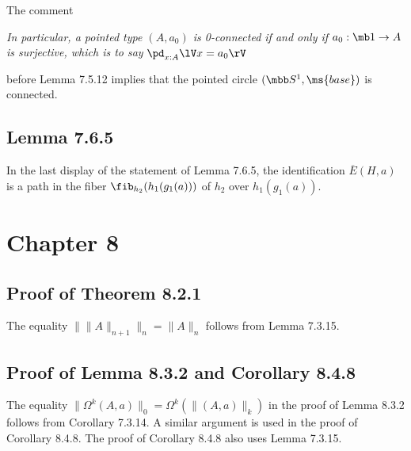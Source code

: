 \documentclass[12pt]{article}
\begin{document}
The comment

\nn\emph{In particular, a pointed type $(A, a_0)$ is 0-connected if and only if $a_0:\mb1\to A$ is surjective, which is to say} $\pd_{x:A}\lV x= a_0\rV$

\nn before Lemma 7.5.12 implies that the pointed circle $(\mbb S^1,\ms{base})$ is connected.


\subsection{Lemma 7.6.5}

In the last display of the statement of Lemma 7.6.5, the identification $\overline{E}(H,a)$ is a path in the fiber $\fib_{h_2}(h_1(g_1(a)))$ of $h_2$ over $h_1(g_1(a))$.


\section{Chapter 8}




\subsection{Proof of Theorem 8.2.1}

The equality $\lVert\lVert A\rVert_{n+1}\rVert_n=\lVert A\rVert_n$ follows from Lemma 7.3.15.


\subsection{Proof of Lemma 8.3.2 and Corollary 8.4.8}

The equality $\lVert\Omega^k(A,a)\rVert_0=\Omega^k(\lVert(A,a)\rVert_k)$ in the proof of Lemma 8.3.2 follows from Corollary 7.3.14. A similar argument is used in the proof of Corollary 8.4.8. The proof of Corollary 8.4.8 also uses Lemma 7.3.15.

\end{document}
